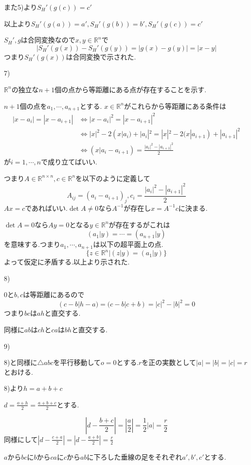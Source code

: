 \documentclass{jsarticle}
\begin{document}
また5)より$S_H'(g(c))=c'$

以上より$S_H'(g(a))=a',S_H'(g(b))=b',S_H'(g(c))=c'$

$S_H',g$は合同変換なので$x,y\in\mathbb{R}^n$で
\[|S_H'(g(x))-S_H'(g(y))=|g(x)-g(y)|=|x-y|\]
つまり$S_H'(g(x))$は合同変換で示された.

7)

$\mathbb{R}^n$の独立な$n+1$個の点から等距離にある点が存在することを示す.

$n+1$個の点を$a_1,\cdots,a_{n+1}$とする.
$x\in\mathbb{R}^n$がこれらから等距離にある条件は
\begin{align*}
|x-a_i|=|x-a_{i+1}| &\Leftrightarrow |x-a_i|^2=|x-a_{i+1}|^2\\
&\Leftrightarrow |x|^2 -2(x|a_i) + |a_i|^2 = |x|^2 -2(x|a_{i+1}) + |a_{i+1}|^2\\
&\Leftrightarrow (x|a_i-a_{i+1}) = \frac{|a_i|^2-|a_{i+1}|^2}{2}
\end{align*}
が$i=1,\cdots,n$で成り立てばいい.

つまり$A\in\mathbb{R}^{n\times n},c\in \mathbb{R}^n$を以下のように定義して
\[A_{ij}=(a_i-a_{i+1})_j,c_i=\frac{|a_i|^2-|a_{i+1}|^2}{2}\]
$Ax=c$であればいい.$\det A \neq 0$なら$A^{-1}$が存在し$x = A^{-1}c$に決まる.

$\det A = 0$なら$Ay=0$となる$y\in\mathbb{R}^n$が存在するがこれは
\[(a_1|y)=\cdots=(a_{n+1}|y)\]
を意味する.つまり$a_1,\cdots,a_{n+1}$は以下の超平面上の点.
\[\{z\in\mathbb{R}^n|(z|y)=(a_1|y)\}\]
よって仮定に矛盾する.以上より示された.

8)

$0$と$b,c$は等距離にあるので
\[(c-b|h-a)=(c-b|c+b)=|c|^2-|b|^2=0\]
つまり$bc$は$ah$と直交する.

同様に$ab$は$ch$と$ca$は$bh$と直交する.

9)

8)と同様に$\triangle{abc}$を平行移動して$o=0$とする.$r$を正の実数として$|a|=|b|=|c|=r$とおける.

8)より$h=a+b+c$

$d=\frac{o+h}{2}=\frac{a+b+c}{2}$とする.

\[|d-\frac{b+c}{2}|=|\frac{a}{2}|=\frac{1}{2}|a|=\frac{r}{2}\]
同様にして$|d-\frac{c+a}{2}|=|d-\frac{a+b}{2}|=\frac{r}{2}$

$a$から$bc$に$b$から$ca$に$c$から$ab$に下ろした垂線の足をそれぞれ$a',b',c'$とする.
\end{document}
